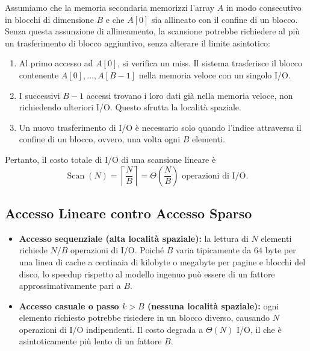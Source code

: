 Assumiamo che la memoria secondaria memorizzi l'array $A$ in modo consecutivo in blocchi di dimensione $B$ e che $A[0]$ sia allineato con il confine di un blocco. Senza questa assunzione di allineamento, la scansione potrebbe richiedere al più un trasferimento di blocco aggiuntivo, senza alterare il limite asintotico:

\begin{enumerate}
  \item Al primo accesso ad $A[0]$, si verifica un miss. Il sistema trasferisce il blocco contenente $A[0], \ldots, A[B-1]$ nella memoria veloce con un singolo I/O.
  \item I successivi $B-1$ accessi trovano i loro dati già nella memoria veloce, non richiedendo ulteriori I/O. Questo sfrutta la località spaziale.
  \item Un nuovo trasferimento di I/O è necessario solo quando l'indice attraversa il confine di un blocco, ovvero, una volta ogni $B$ elementi.
\end{enumerate}

Pertanto, il costo totale di I/O di una scansione lineare è
\[
  \operatorname{Scan}(N) = \left\lceil \frac{N}{B} \right\rceil
  = \Theta\!\left(\frac{N}{B}\right)\text{ operazioni di I/O}.
\]

\FloatBarrier
\subsection{Accesso Lineare contro Accesso Sparso}

\begin{itemize}
  \item \textbf{Accesso sequenziale (alta località spaziale):} la lettura di $N$ elementi richiede $N/B$ operazioni di I/O. Poiché $B$ varia tipicamente da $64$ byte per una linea di cache a centinaia di kilobyte o megabyte per pagine e blocchi del disco, lo speedup rispetto al modello ingenuo può essere di un fattore approssimativamente pari a $B$.
  \item \textbf{Accesso casuale o passo $k>B$ (nessuna località spaziale):} ogni elemento richiesto potrebbe risiedere in un blocco diverso, causando $N$ operazioni di I/O indipendenti. Il costo degrada a $\Theta(N)$ I/O, il che è asintoticamente più lento di un fattore $B$.
\end{itemize}
